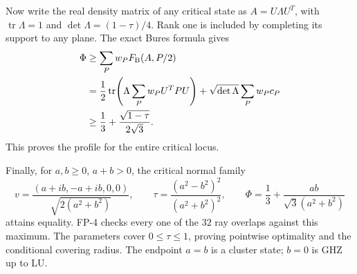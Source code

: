Now write the real density matrix of any critical state as
$A=U\Lambda U^T$, with $\operatorname{tr}\Lambda=1$ and
$\det\Lambda=(1-\tau)/4$. Rank one is included by completing its
support to any plane. The exact Bures formula gives
\begin{align*}
 \Phi
 &\ge\sum_Pw_P F_{\rm B}(A,P/2)\\
 &=\frac12\operatorname{tr}\!\left(\Lambda\sum_Pw_PU^TPU\right)
                  +\sqrt{\det\Lambda}\sum_Pw_Pc_P\\
 &\ge\frac13+\frac{\sqrt{1-\tau}}{2\sqrt3}.
\end{align*}
This proves the profile for the entire critical locus.

Finally, for $a,b\ge0$, $a+b>0$, the critical normal family
\begin{equation}\label{eq:fqe-covering-equality-family}
 v=\frac{(a+ib,-a+ib,0,0)}{\sqrt{2(a^2+b^2)}},\qquad
 \tau=\frac{(a^2-b^2)^2}{(a^2+b^2)^2},\qquad
 \Phi=\frac13+\frac{ab}{\sqrt3(a^2+b^2)}
\end{equation}
attains equality. FP-4 checks every one of the $32$ ray overlaps against
this maximum. The parameters cover $0\le\tau\le1$, proving pointwise
optimality and the conditional covering radius. The endpoint $a=b$
is a cluster state; $b=0$ is GHZ up to LU.
